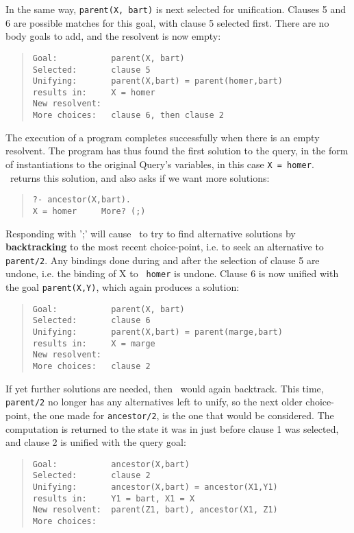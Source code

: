 In the same way, \verb'parent(X, bart)' is next selected for 
unification. Clauses 5 and 6 are possible matches for this goal,
with clause 5 selected first. There are no body goals to add, and
the resolvent is now empty:
\begin{quote}\begin{verbatim}
Goal:           parent(X, bart)
Selected:       clause 5
Unifying:       parent(X,bart) = parent(homer,bart)
results in:     X = homer
New resolvent:  
More choices:   clause 6, then clause 2
\end{verbatim}\end{quote}
The execution of a program completes successfully when there is an
empty resolvent. The program has thus found the first solution 
to the query, in the form of instantiations to the original Query's
variables, in this case {\tt X = homer}. \eclipse\ returns this
solution, and also asks if we want more solutions:
\begin{quote}\begin{verbatim}
?- ancestor(X,bart).
X = homer     More? (;) 
\end{verbatim}\end{quote}
Responding with ';' will cause \eclipse\ to try to find alternative
solutions by {\bf backtracking} to
the most recent choice-point, i.e. to seek an alternative to 
{\tt parent/2}. Any bindings done during and after the selection of 
clause 5 are undone, i.e. the binding of  X to {\tt 
homer} is undone. Clause 6 is now unified with
the goal {\tt parent(X,Y)}, which again produces a solution:
\begin{quote}\begin{verbatim}
Goal:           parent(X, bart)
Selected:       clause 6
Unifying:       parent(X,bart) = parent(marge,bart)
results in:     X = marge
New resolvent:  
More choices:   clause 2
\end{verbatim}\end{quote}
If yet further solutions are needed, then \eclipse\ would again backtrack.
This time, {\tt parent/2} no longer has any alternatives left to unify,
so the next older choice-point, the one made for {\tt ancestor/2},
is the one that would be considered. The computation is returned
to the state it was in just before clause 1 was selected, and clause 2
is unified with the query goal:
\begin{quote}\begin{verbatim}
Goal:           ancestor(X,bart)
Selected:       clause 2
Unifying:       ancestor(X,bart) = ancestor(X1,Y1)
results in:     Y1 = bart, X1 = X
New resolvent:  parent(Z1, bart), ancestor(X1, Z1)
More choices:   
\end{verbatim}\end{quote}
